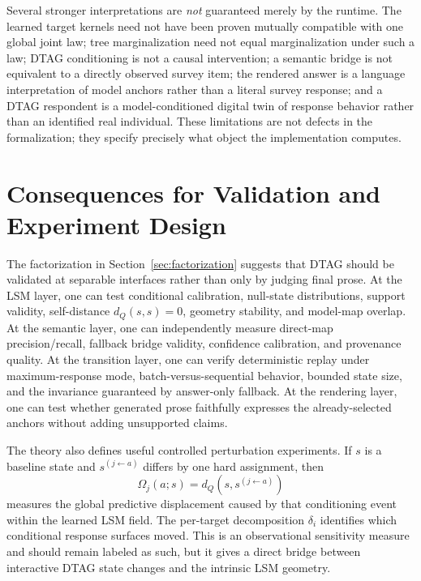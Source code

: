 \documentclass[journal]{IEEEtran}
\newcommand{\1}{\mathbf{1}}
\begin{document}
Several stronger interpretations are \emph{not} guaranteed merely by the runtime. The learned target kernels need not have been proven mutually compatible with one global joint law; tree marginalization need not equal marginalization under such a law; DTAG conditioning is not a causal intervention; a semantic bridge is not equivalent to a directly observed survey item; the rendered answer is a language interpretation of model anchors rather than a literal survey response; and a DTAG respondent is a model-conditioned digital twin of response behavior rather than an identified real individual. These limitations are not defects in the formalization; they specify precisely what object the implementation computes.

\section{Consequences for Validation and Experiment Design}
\label{sec:validation}

The factorization in Section~\ref{sec:factorization} suggests that DTAG should be validated at separable interfaces rather than only by judging final prose. At the LSM layer, one can test conditional calibration, null-state distributions, support validity, self-distance $d_Q(s,s)=0$, geometry stability, and model-map overlap. At the semantic layer, one can independently measure direct-map precision/recall, fallback bridge validity, confidence calibration, and provenance quality. At the transition layer, one can verify deterministic replay under maximum-response mode, batch-versus-sequential behavior, bounded state size, and the invariance guaranteed by answer-only fallback. At the rendering layer, one can test whether generated prose faithfully expresses the already-selected anchors without adding unsupported claims.

The theory also defines useful controlled perturbation experiments. If $s$ is a baseline state and $s^{(j\leftarrow a)}$ differs by one hard assignment, then
\begin{equation}
  \Omega_j(a;s)=d_Q\!\left(s,s^{(j\leftarrow a)}\right)
  \label{eq:perturbation}
\end{equation}
measures the global predictive displacement caused by that conditioning event within the learned LSM field. The per-target decomposition $\delta_i$ identifies which conditional response surfaces moved. This is an observational sensitivity measure and should remain labeled as such, but it gives a direct bridge between interactive DTAG state changes and the intrinsic LSM geometry.
\end{document}
